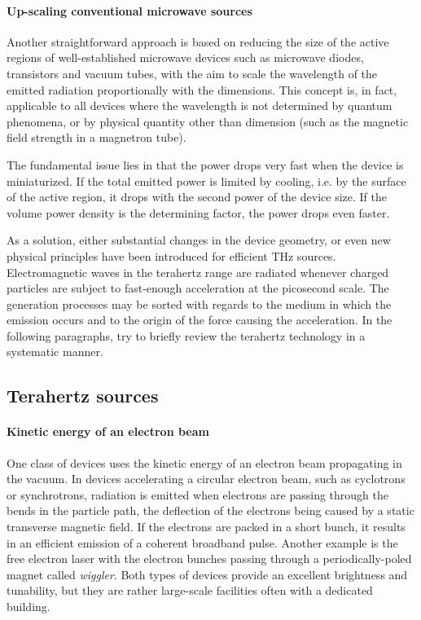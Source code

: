 
\paragraph{Up-scaling conventional microwave sources}
Another straightforward approach is based on reducing the size of the active regions of well-established microwave devices such as microwave diodes, transistors and vacuum tubes, with the aim to scale the wavelength of the emitted radiation proportionally with the dimensions. 
This concept is, in fact, applicable to all %
 devices where the wavelength is not determined by quantum phenomena, or by physical quantity other than dimension (such as the magnetic field strength in a magnetron tube).

The fundamental issue lies in that the power drops very fast when the device is miniaturized. If the total emitted power is limited by cooling, i.e. by the surface of the active region, it drops with the second power of the device size. If the volume power density is the determining factor, the power drops even faster. 

As a solution, either substantial changes in the device geometry, or even new physical principles have been introduced for efficient THz sources. 
Electromagnetic waves in the terahertz range are radiated whenever charged particles are subject to fast-enough acceleration at the picosecond scale. 
The generation processes may be sorted with regards to the medium in which the emission occurs and to the origin of the force causing the acceleration.  %
In the following paragraphs, try to briefly review the terahertz technology in a systematic manner.

\subsection{Terahertz sources}
\paragraph{Kinetic energy of an electron beam}
One class of devices uses the kinetic energy of an electron beam propagating in the vacuum. In devices accelerating a circular electron beam, such as cyclotrons or synchrotrons, radiation is emitted when electrons are passing through the bends in the particle path, the deflection of the electrons being caused by a static transverse magnetic field. If the electrons are packed in a short bunch, it results in an efficient emission of a coherent broadband pulse. %
Another example is the free electron laser with the electron bunches %
passing through a periodically-poled magnet called \textit{wiggler}. 
Both types of devices provide an excellent brightness and tunability, but they are rather large-scale facilities often with a dedicated building. 

